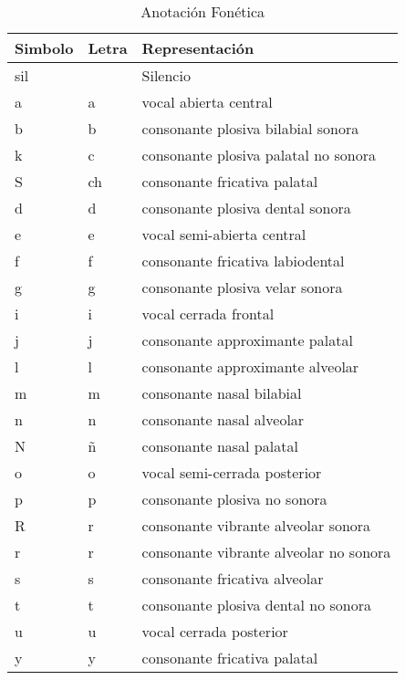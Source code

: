 \begin{table}[H]
\centering
\caption{Anotación Fonética}
\label{tab:anotacion_fonetica}
\begin{tabular}{|l|l|l|}
\hline
\textbf{Simbolo} & \textbf{Letra} & \textbf{Representación} \\ \hline
sil              & & Silencio                               \\ \hline
a                & a & vocal abierta central                   \\ \hline
b                & b &  consonante plosiva bilabial sonora   \\ \hline 
k                & c &  consonante plosiva palatal no sonora \\ \hline 
S                & ch &  consonante fricativa palatal        \\ \hline 
d                & d &  consonante plosiva dental sonora     \\ \hline 
e                & e &  vocal semi-abierta central              \\ \hline
f                & f &  consonante fricativa labiodental     \\ \hline 
g                & g &  consonante plosiva velar sonora      \\ \hline
i                & i &  vocal cerrada frontal                   \\ \hline
j                & j &  consonante approximante palatal       \\ \hline
l                & l &  consonante approximante alveolar      \\ \hline 
m                & m &  consonante nasal bilabial            \\ \hline 
n                & n &  consonante nasal alveolar            \\ \hline 
N                & ñ &  consonante nasal palatal             \\ \hline 
o                & o &  vocal semi-cerrada posterior               \\ \hline
p                & p &  consonante plosiva no sonora         \\ \hline 
R                & r &  consonante vibrante alveolar sonora   \\ \hline 
r                & r &  consonante vibrante alveolar no sonora \\ \hline
s                & s &  consonante fricativa alveolar         \\ \hline
t                & t &  consonante plosiva dental no sonora   \\ \hline
u                & u &  vocal cerrada posterior                    \\ \hline
y                & y &  consonante fricativa palatal         \\ \hline
\end{tabular}
\end{table}